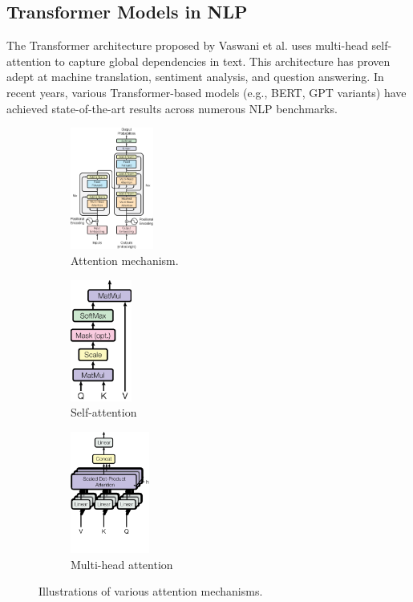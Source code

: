 \documentclass[12pt]{article}
\begin{document}
\subsection{Transformer Models in NLP}
The Transformer architecture proposed by Vaswani et al. \cite{ref1} uses multi-head self-attention to capture global dependencies in text. This architecture has proven adept at machine translation, sentiment analysis, and question answering. In recent years, various Transformer-based models (e.g., BERT, GPT variants) have achieved state-of-the-art results across numerous NLP benchmarks. 

\begin{figure}[!ht]
	\centering
	\begin{subfigure}[b]{0.32\textwidth}
		\centering
		\includegraphics[height=4cm]{attention.png}
		\caption*{Attention mechanism.}
	\end{subfigure}
	\hfill
	\begin{subfigure}[b]{0.32\textwidth}
		\centering
		\includegraphics[height=4cm]{self_attention_mechanism.png}
		\caption*{Self-attention}
	\end{subfigure}
	\hfill
	\begin{subfigure}[b]{0.32\textwidth}
		\centering
		\includegraphics[height=4cm]{multihead_attention.png}
		\caption*{Multi-head attention}
	\end{subfigure}
	\caption{Illustrations of various attention mechanisms.}
	\label{fig:attention_mechanisms}
\end{figure}
\end{document}
